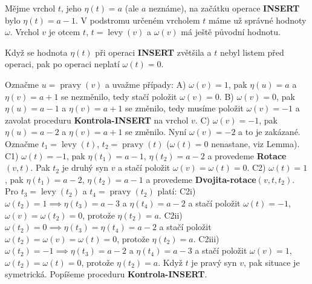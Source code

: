 \documentclass[a4paper,12pt]{article}
\DeclareMathOperator*{\levy}{levy}
\DeclareMathOperator*{\pravy}{pravy}
\begin{document}
Mějme vrchol $t$, jeho $\eta (t)=a$ (ale $a$ neznáme), na 
začátku 
ope\-ra\-ce {\bf INSERT} bylo $\eta (t)=a-1$.  V podstromu určeném 
vrcholem $t$ máme už správné hodnoty $\omega$.  Vrchol $
v$ je otcem $t$, 
$t=\levy(v)$ a $\omega (v)$ má ještě původní hodnotu.  

\begin{lemma}Když se hodnota $\eta (t)$ při operaci {\bf INSERT }
zvětšila a $t$ nebyl listem před operaci, pak po operaci 
neplatí $\omega (t)=0$.
\end{lemma}

Označme $u=\pravy(v)$ a uvažme případy:\newline 
A) $\omega (v)=1$, pak $\eta (u)=a$ a $\eta (v)=a+1$ se nezměnilo, 
tedy stačí položit $\omega (v)=0$.\newline 
B) $\omega (v)=0$, pak $\eta (u)=a-1$ a $\eta (v)=a+1$ se změnilo, 
tedy musíme položit $\omega (v)=-1$ a zavolat proceduru 
{\bf Kontrola-INSERT} na vrchol $v$.\newline 
C) $\omega (v)=-1$, pak $\eta (u)=a-2$ a $\eta (v)=a+1$ se změnilo. 
Nyní $\omega (v)=-2$ a to je zakázané. Označme $t_1=\levy
(t)$, 
$t_2=\pravy(t)$ ($\omega (t)=0$ nenastane, viz Lemma). 
\newline 
C1) $\omega (t)=-1$, pak $\eta (t_1)=a-1$, $\eta (t_2)=a-2$ a provedeme 
{\bf Rotace$(v,t)$}. Pak $t_2$ je druhý syn $v$ a stačí položit 
$\omega (v)=\omega (t)=0$.\newline 
C2) $\omega (t)=1$, pak $\eta (t_1)=a-2$, $\eta (t_2)=a-1$ a provedeme 
{\bf Dvojita-rotace$(v,t,t_2)$}. Pro $t_3=\levy(t_2)$ a $t_4=\pravy
(t_2)$ 
platí:\newline 
C2i) $\omega (t_2)=1\implies\eta (t_3)=a-3$ a $\eta (t_4)=a-2$ a stačí 
položit $\omega (t)=-1$, $\omega (v)=\omega (t_2)=0$, protože $
\eta (t_2)=a$.\newline 
C2ii) $\omega (t_2)=0\implies\eta (t_3)=\eta (t_4)=a-2$ a stačí položit 
$\omega (t_2)=\omega (v)=\omega (t)=0$, protože $\eta (t_2)=a$. \newline 
C2iii) $\omega (t_2)=-1\implies\eta (t_3)=a-2$ a $\eta (t_4)=a-3$ a 
stačí položit $\omega (v)=1$, $\omega (t_2)=\omega (t)=
0$, protože $\eta (t_2)=a$.\newline 
Když $t$ je pravý syn $v$, pak situace je symetrická.\newline 
Popíšeme proceduru {\bf Kontrola-INSERT}.
\end{document}
